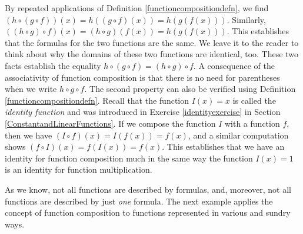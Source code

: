 \documentclass{ximera}
\begin{document}
\medskip

By repeated applications of Definition \ref{functioncompositiondefn}, we find  $(h \circ (g \circ f))(x) = h((g \circ f)(x)) = h(g(f(x)))$.  Similarly, $((h \circ g) \circ f)(x) = (h \circ g)(f(x)) = h(g(f(x)))$.  This establishes that the formulas for the two functions are the same.  We leave it to the reader to think about why the domains of these two functions are identical, too.  These two facts establish the equality $h \circ (g \circ f) = (h \circ g) \circ f$.  A consequence of the associativity of function composition is that there is no need for parentheses when we write $h \circ g \circ f$. The second property can also be verified using Definition \ref{functioncompositiondefn}.  Recall that the function $I(x) = x$ is called the  \textit{identity function} and was introduced in Exercise  \ref{identityexercise} in Section \ref{ConstantandLinearFunctions}.  If we compose the function $I$ with a function $f$, then we have $(I \circ f)(x) = I(f(x)) = f(x)$, and a similar computation shows $(f\circ I)(x) = f(I(x)) = f(x)$. This establishes that we have an identity for function composition much in the same way the function $I(x) = 1$ is an identity for function multiplication. 

As we know, not all functions are described by formulas, and, moreover, not all functions are described by just \textit{one} formula.  The next example applies the concept of function composition to functions represented in various and sundry ways.
\end{document}

